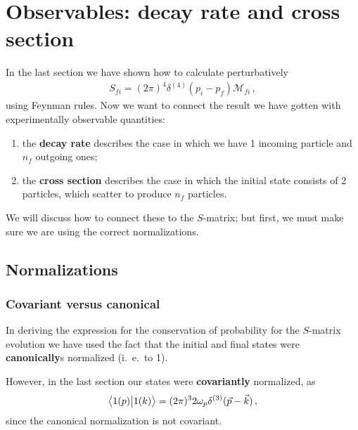 \documentclass[main.tex]{subfiles}
\begin{document}
\section{Observables: decay rate and cross section}


In the last section we have shown how to calculate perturbatively 
%
\begin{align}
S_{fi} = (2 \pi )^{4} \delta^{(4)}(p_i - p_f) \mathcal{M}_{fi}
\,,
\end{align}
%
using Feynman rules. 
Now we want to connect the result we have gotten with experimentally observable quantities: 
\begin{enumerate}
    \item the \textbf{decay rate} describes the case in which we have 1 incoming particle and \(n_f\) outgoing ones;
    \item the \textbf{cross section} describes the case in which the initial state consists of 2 particles, which scatter to produce \(n_f\) particles.
\end{enumerate}

We will discuss how to connect these to the \(S\)-matrix; but first, we must make sure we are using the correct normalizations. 

\subsection{Normalizations}

\subsubsection{Covariant versus canonical}

In deriving the expression for the conservation of probability for the \(S\)-matrix evolution we have used the fact that the initial and final states were \textbf{canonically}s normalized (i.\ e.\ to 1). 

However, in the last section our states were \textbf{covariantly} normalized, as 
%
\begin{align}
\braket{1(p)}{1(k)} = (2 \pi )^3 2 \omega_{p} \delta^{(3)} (\vec{p} - \vec{k}) 
\,,
\end{align}
%
since the canonical normalization is not covariant. 
\end{document}
